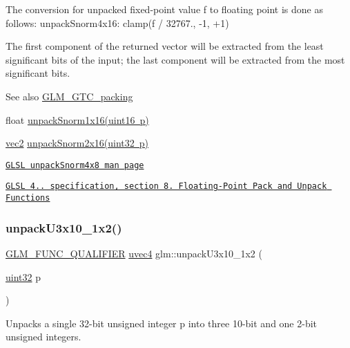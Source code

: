 The conversion for unpacked fixed-\/point value f to floating point is done as follows\+: unpack\+Snorm4x16\+: clamp(f / 32767., -\/1, +1)

The first component of the returned vector will be extracted from the least significant bits of the input; the last component will be extracted from the most significant bits.

\begin{DoxySeeAlso}{See also}
\mbox{\hyperlink{group__gtc__packing}{G\+L\+M\+\_\+\+G\+T\+C\+\_\+packing}} 

float \mbox{\hyperlink{group__gtc__packing_ga246f451cebf590726324f7a283e3d65e}{unpack\+Snorm1x16(uint16 p)}} 

\mbox{\hyperlink{group__core__types_gaa1618f51db67eaa145db101d8c8431d8}{vec2}} \mbox{\hyperlink{group__core__func__packing_gacd8f8971a3fe28418be0d0fa1f786b38}{unpack\+Snorm2x16(uint32 p)}} 

\href{http://www.opengl.org/sdk/docs/manglsl/xhtml/unpackSnorm2x16.xml}{\tt G\+L\+SL unpack\+Snorm4x8 man page} 

\href{http://www.opengl.org/registry/doc/GLSLangSpec.4.20.8.pdf}{\tt G\+L\+SL 4.. specification, section 8. Floating-\/\+Point Pack and Unpack Functions} 
\end{DoxySeeAlso}
\mbox{\label{group__gtc__packing_ga119aa2d7d55952f9dc4214390a6ffefc}} 
\subsubsection{\texorpdfstring{unpack\+U3x10\+\_\+1x2()}{unpackU3x10\_1x2()}}
{\footnotesize\ttfamily \mbox{\hyperlink{setup_8hpp_a33fdea6f91c5f834105f7415e2a64407}{G\+L\+M\+\_\+\+F\+U\+N\+C\+\_\+\+Q\+U\+A\+L\+I\+F\+I\+ER}} \mbox{\hyperlink{group__core__types_ga1c426d19627b32b14f0089f7f4ba7b1d}{uvec4}} glm\+::unpack\+U3x10\+\_\+1x2 (\begin{DoxyParamCaption}\item[{\mbox{\hyperlink{group__gtc__type__precision_ga202b6a53c105fcb7e531f9b443518451}{uint32}}}]{p }\end{DoxyParamCaption})}

Unpacks a single 32-\/bit unsigned integer p into three 10-\/bit and one 2-\/bit unsigned integers.

